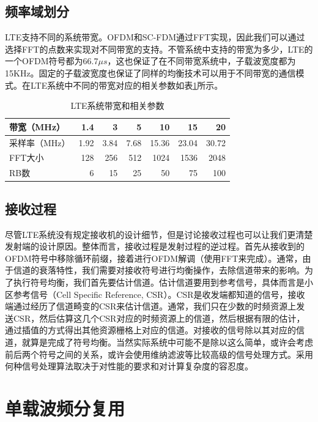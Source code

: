 \documentclass[10pt,a4paper,UTF8]{article}
\begin{document}
\subsection{频率域划分}
\label{sec:orgheadline11}


LTE支持不同的系统带宽。OFDM和SC-FDM通过FFT实现，因此我们可以通过选择FFT的点数来实现对不同带宽的支持。不管系统中支持的带宽为多少，LTE的一个OFDM符号都为66.7\(\mu s\)，这也保证了在不同带宽系统中，子载波宽度都为15KHz。固定的子载波宽度也保证了同样的均衡技术可以用于不同带宽的通信模式。在LTE系统中不同的带宽对应的相关参数如表\ref{tab:orgtable2}所示。
\begin{table}[htb]
\caption{\label{tab:orgtable2}
LTE系统带宽和相关参数}
\centering
\begin{tabular}{lrrrrrr}
\hline
带宽（MHz） & 1.4 & 3 & 5 & 10 & 15 & 20\\
\hline
采样率（MHz） & 1.92 & 3.84 & 7.68 & 15.36 & 23.04 & 30.72\\
FFT大小 & 128 & 256 & 512 & 1024 & 1536 & 2048\\
RB数 & 6 & 15 & 25 & 50 & 75 & 100\\
\hline
\end{tabular}
\end{table}
\subsection{接收过程}
\label{sec:orgheadline12}


尽管LTE系统没有规定接收机的设计细节，但是讨论接收过程也可以让我们更清楚发射端的设计原因。整体而言，接收过程是发射过程的逆过程。首先从接收到的OFDM符号中移除循环前缀，接着进行OFDM解调（使用FFT来完成）。通常，由于信道的衰落特性，我们需要对接收符号进行均衡操作，去除信道带来的影响。为了执行符号均衡，我们首先要估计信道。估计信道要用到参考信号，具体而言是小区参考信号（Cell Specific Reference, CSR）。CSR是收发端都知道的信号，接收端通过经历了信道畸变的CSR来估计信道。通常，我们只在少数的时频资源上发送CSR，然后估算这几个CSR对应的时频资源上的信道，然后根据有限的估计，通过插值的方式得出其他资源栅格上对应的信道。对接收的信号除以其对应的信道，就算是完成了符号均衡。当然实际系统中可能不是除以这么简单，或许会考虑前后两个符号之间的关系，或许会使用维纳滤波等比较高级的信号处理方式。采用何种信号处理算法取决于对性能的要求和对计算复杂度的容忍度。
\section{单载波频分复用}
\label{sec:orgheadline14}
\end{document}
